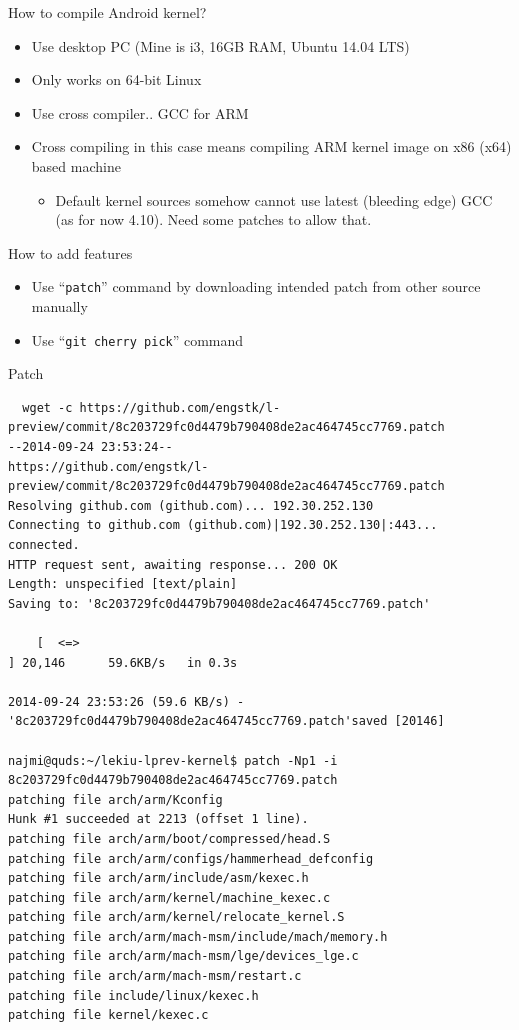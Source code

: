 \documentclass{beamer}
\begin{document}
    
 \begin{frame}{How to compile Android kernel?}
 \begin{itemize}
  \item Use desktop PC (Mine is i3, 16GB RAM, Ubuntu 14.04 LTS)
  \item Only works on 64-bit Linux
  \item Use cross compiler.. GCC for ARM
  \item Cross compiling in this case means compiling ARM kernel image on x86 (x64) based machine
  \begin{itemize}
   \item Default kernel sources somehow cannot use latest (bleeding edge) GCC (as for now 4.10). Need some patches
   to allow that.
  \end{itemize}
 \end{itemize}  
 \end{frame}
   
\begin{frame}{How to add features}
\begin{itemize}
 \item Use ``\texttt{patch}'' command by downloading intended patch from other source manually
 \item Use ``\texttt{git cherry pick}'' command 
\end{itemize}
\end{frame}

\begin{frame}[fragile]{Patch}
 \tiny \begin{Verbatim}
  wget -c https://github.com/engstk/l-preview/commit/8c203729fc0d4479b790408de2ac464745cc7769.patch
--2014-09-24 23:53:24--
https://github.com/engstk/l-preview/commit/8c203729fc0d4479b790408de2ac464745cc7769.patch
Resolving github.com (github.com)... 192.30.252.130
Connecting to github.com (github.com)|192.30.252.130|:443... connected.
HTTP request sent, awaiting response... 200 OK
Length: unspecified [text/plain]
Saving to: '8c203729fc0d4479b790408de2ac464745cc7769.patch'

    [  <=>                                                                                                               ] 20,146      59.6KB/s   in 0.3s   

2014-09-24 23:53:26 (59.6 KB/s) - '8c203729fc0d4479b790408de2ac464745cc7769.patch'saved [20146]

najmi@quds:~/lekiu-lprev-kernel$ patch -Np1 -i 8c203729fc0d4479b790408de2ac464745cc7769.patch 
patching file arch/arm/Kconfig
Hunk #1 succeeded at 2213 (offset 1 line).
patching file arch/arm/boot/compressed/head.S
patching file arch/arm/configs/hammerhead_defconfig
patching file arch/arm/include/asm/kexec.h
patching file arch/arm/kernel/machine_kexec.c
patching file arch/arm/kernel/relocate_kernel.S
patching file arch/arm/mach-msm/include/mach/memory.h
patching file arch/arm/mach-msm/lge/devices_lge.c
patching file arch/arm/mach-msm/restart.c
patching file include/linux/kexec.h
patching file kernel/kexec.c

 \end{Verbatim}

\end{frame}
\end{document}
